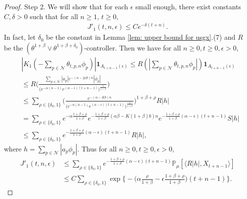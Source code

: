 \documentclass[12pt,a4paper]{amsart}
\theoremstyle{plain}
\theoremstyle{definition}
\numberwithin{equation}{section}
\begin{document}
\begin{proof}
Step 2.  We will show that for each $\epsilon$ small enough, there exist constants $C,\delta>0$ such that for all $n\geq 1, \, t\geq 0$, 
    \begin{align}
    \label{eq:large rate J1}
      J'_1(t,n,\epsilon)\leq C e^{-\delta(t+n)}. %
    \end{align}
	In fact, let $\delta_0$ be the constant in Lemma \ref{lem: upper bound for usgx}.(7) and $R$ be the $(\theta^{1+\beta}\vee \theta^{1+\beta+\delta_0})$-controller. Then we have
	for all $n\geq 0, t\geq 0, \epsilon > 0$, 
\begin{align}
   & |K_1(-\sum_{p\in \mathcal{N}}\theta_{t,p,n}\phi_p)|\mathbf{1}_{A_{t+n-1}(\epsilon)}
   \leq R(|\sum_{p\in\mathcal{N}}\theta_{t,p,n}\phi_p|)\mathbf{1}_{A_{t+n-1}(\epsilon)}
   \\&\leq R \Big(\frac{\sum_{p\in\mathcal{N}}|a_p|e^{-(\alpha-|p|b)n}|\phi_p|}{\big(e^{-\alpha(n-1)}e^{(\alpha-\epsilon)(t+n-1)}\big)^{\frac{1}{1+\beta}}}\Big)
   \\&\leq \sum_{\rho\in\{\delta_0,1\}}\Big(\frac{e^{-(\alpha-Kb)n}}{\big(e^{-\alpha(n-1)}e^{(\alpha-\epsilon)(t+n-1)}\big)^{\frac{1}{1+\beta}}}\Big)^{1+\beta+\rho}R|h|
   \\&=\sum_{\rho\in\{\delta_0,1\}}e^{-\alpha\frac{1+\beta+\rho}{1+\beta}}e^{-\frac{1+\beta+\rho}{1+\beta}(\alpha\beta-K(1+\beta)b)n}e^{-\frac{1+\beta+\rho}{1+\beta}(\alpha-\epsilon)(t+n-1)}S|h|
   \\&\leq \sum_{\rho\in\{\delta_0,1\}}e^{-\frac{1+\beta+\rho}{1+\beta}(\alpha-\epsilon)(t+n-1)}R|h|,
\end{align}
where $h=\sum_{p\in \mathcal{N}}|a_p\phi_p|$.
Thus for all $n\geq 0,  t\geq 0, \epsilon > 0$,
\begin{align}
\label{eq: estimate of J11}
     J'_1(t,n,\epsilon)&
     \leq  \sum_{\rho\in\{\delta_0,1\}}e^{-\frac{1+\beta+\rho}{1+\beta}(\alpha-\epsilon)(t+n-1)}\mathbb{P}_{\mu}[\langle R|h|,X_{t+n-1}\rangle]\\
     & \leq C\sum_{\rho\in\{\delta_0,1\}}\exp\Big\{-\Big(\alpha\frac{\rho}{1+\beta}-\epsilon\frac{1+\beta+\rho}{1+\beta}\Big)(t+n-1)\Big\}.
     \end{align}


\end{proof}
\end{document}
